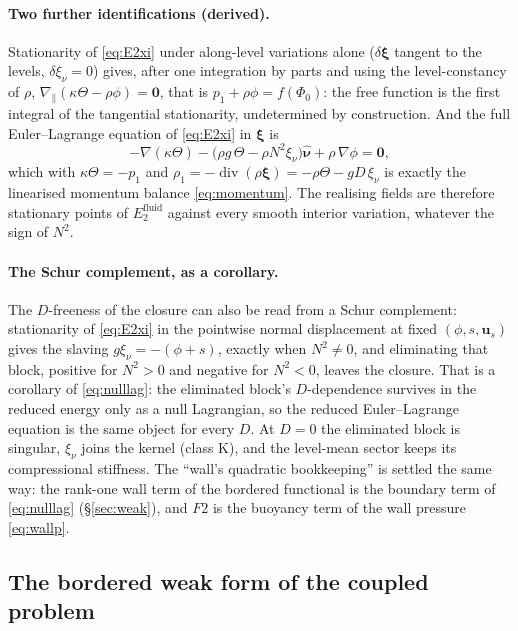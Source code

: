 \documentclass[11pt]{article}
\theoremstyle{definition}
\theoremstyle{remark}
\newcommand{\bu}{\mathbf{u}}
\newcommand{\bxi}{\boldsymbol{\xi}}
\newcommand{\Div}{\operatorname{div}}
\newcommand{\nuh}{\hat{\boldsymbol{\nu}}}
\begin{document}
\paragraph{Two further identifications (derived).} Stationarity of
\eqref{eq:E2xi} under along-level variations alone ($\delta\bxi$
tangent to the levels, $\delta\xi_\nu = 0$) gives, after one
integration by parts and using the level-constancy of $\rho$,
$\nabla_{\!\parallel}(\kappa\Theta - \rho\phi) = \mathbf 0$, that is $p_1
+ \rho\phi = f(\Phi_0)$: the free function is the first integral of
the tangential stationarity, undetermined by construction. And the
full Euler--Lagrange equation of \eqref{eq:E2xi} in $\bxi$ is
\begin{equation*}
  -\nabla(\kappa\Theta) - \bigl(\rho g\,\Theta - \rho N^2\xi_\nu\bigr)\nuh
  + \rho\,\nabla\phi = \mathbf 0 ,
\end{equation*}
which with $\kappa\Theta = -p_1$ and $\rho_1 = -\Div(\rho\bxi) =
-\rho\Theta - gD\,\xi_\nu$ is exactly the linearised momentum balance
\eqref{eq:momentum}. The realising fields are therefore stationary
points of $E_2^{\mathrm{fluid}}$ against every smooth interior
variation, whatever the sign of $N^2$.

\paragraph{The Schur complement, as a corollary.} The $D$-freeness of
the closure can also be read from a Schur complement:
stationarity of \eqref{eq:E2xi} in the pointwise normal displacement at
fixed $(\phi, s, \bu_s)$ gives the slaving $g\xi_\nu = -(\phi + s)$,
exactly when $N^2 \ne 0$, and eliminating that block, positive for $N^2
> 0$ and negative for $N^2 < 0$, leaves the closure. That is a
corollary of \eqref{eq:nulllag}: the eliminated block's $D$-dependence
survives in the reduced energy only as a null Lagrangian, so the
reduced Euler--Lagrange equation is the same object for every $D$. At
$D = 0$ the eliminated block is singular, $\xi_\nu$ joins the kernel
(class K), and the level-mean sector keeps its compressional stiffness.
The ``wall's quadratic bookkeeping'' is
settled the same way: the rank-one wall term of the bordered functional
is the boundary term of \eqref{eq:nulllag} (\S\ref{sec:weak}), and $F2$
is the buoyancy term of the wall pressure \eqref{eq:wallp}.

\subsection{The bordered weak form of the coupled problem}
\label{sec:bordered}
\label{sec:weak}
\end{document}
